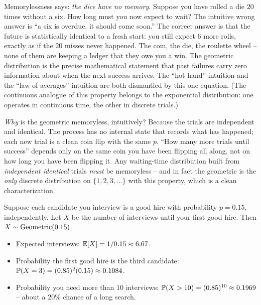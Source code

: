\begin{paradoxbox}
Memorylessness says: \emph{the dice have no memory}. Suppose you have rolled a die
$20$ times without a six. How long must you now expect to wait? The intuitive
wrong answer is ``a six is overdue, it should come soon.'' The correct answer is
that the future is statistically identical to a fresh start: you still expect $6$
more rolls, exactly as if the $20$ misses never happened. The coin, the die, the
roulette wheel -- none of them are keeping a ledger that they owe you a win. The
geometric distribution is the precise mathematical statement that past failures
carry zero information about when the next success arrives. The ``hot hand''
intuition and the ``law of averages'' intuition are both dismantled by this one
equation. (The continuous analogue of this property belongs to the exponential
distribution: one operates in continuous time, the other in discrete trials.)
\end{paradoxbox}

\begin{whybox}
\emph{Why} is the geometric memoryless, intuitively? Because the trials are
independent and identical. The process has no internal state that records what has
happened; each new trial is a clean coin flip with the same $p$. ``How many more
trials until success'' depends only on the same coin you have been flipping all
along, not on how long you have been flipping it. Any waiting-time distribution
built from \emph{independent identical} trials \emph{must} be memoryless -- and in
fact the geometric is the \emph{only} discrete distribution on
$\{1,2,3,\dots\}$ with this property, which is a clean characterization.
\end{whybox}

\begin{example}
\label{ch07:ex-hiring}
Suppose each candidate you interview is a good hire with probability $p = 0.15$,
independently. Let $X$ be the number of interviews until your first good hire.
Then $X \sim \Geom(0.15)$.
\begin{itemize}
\item Expected interviews: $\E[X] = 1/0.15 \approx 6.67$.
\item Probability the first good hire is the third candidate:
  $\P(X = 3) = (0.85)^2 (0.15) \approx 0.1084$.
\item Probability you need more than $10$ interviews:
  $\P(X > 10) = (0.85)^{10} \approx 0.1969$ -- about a $20\%$ chance of a long
  search.
\end{itemize}
\end{example}

